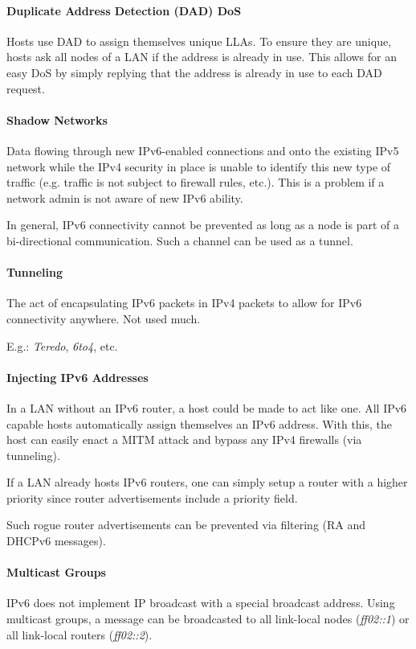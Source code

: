 \paragraph{Duplicate Address Detection (DAD) DoS}
Hosts use DAD to assign themselves unique LLAs. To ensure they are unique, hosts ask all nodes of a LAN if the address is already in use. This allows for an easy DoS by simply replying that the address is already in use to each DAD request.

\paragraph{Shadow Networks}
Data flowing through new IPv6-enabled connections and onto the existing IPv5 network while the IPv4 security in place is unable to identify this new type of traffic (e.g. traffic is not subject to firewall rules, etc.). This is a problem if a network admin is not aware of new IPv6 ability.

In general, IPv6 connectivity cannot be prevented as long as a node is part of a bi-directional communication. Such a channel can be used as a tunnel.

\paragraph{Tunneling}
The act of encapsulating IPv6 packets in IPv4 packets to allow for IPv6 connectivity anywhere. Not used much.

E.g.: \textit{Teredo}, \textit{6to4}, etc.

\paragraph{Injecting IPv6 Addresses}
In a LAN without an IPv6 router, a host could be made to act like one. All IPv6 capable hosts automatically assign themselves an IPv6 address. With this, the host can easily enact a MITM attack and bypass any IPv4 firewalls (via tunneling).

If a LAN already hosts IPv6 routers, one can simply setup a router with a higher priority since router advertisements include a priority field.

Such rogue router advertisements can be prevented via filtering (RA and DHCPv6 messages).

\paragraph{Multicast Groups}
IPv6 does not implement IP broadcast with a special broadcast address. Using multicast groups, a message can be broadcasted to all link-local nodes (\textit{ff02::1}) or all link-local routers (\textit{ff02::2}).

